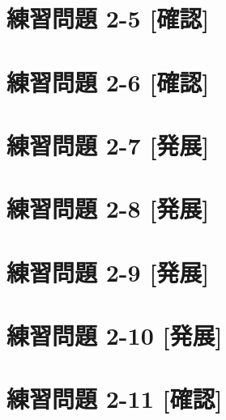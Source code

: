 \documentclass[
]{book}
\begin{document}
\hypertarget{ux7df4ux7fd2ux554fux984c-2-5-ux78baux8a8d}{%
\section*{練習問題 2-5 {[}確認{]}}\label{ux7df4ux7fd2ux554fux984c-2-5-ux78baux8a8d}}

\hypertarget{ux7df4ux7fd2ux554fux984c-2-6-ux78baux8a8d}{%
\section*{練習問題 2-6 {[}確認{]}}\label{ux7df4ux7fd2ux554fux984c-2-6-ux78baux8a8d}}

\hypertarget{ux7df4ux7fd2ux554fux984c-2-7-ux767aux5c55}{%
\section*{練習問題 2-7 {[}発展{]}}\label{ux7df4ux7fd2ux554fux984c-2-7-ux767aux5c55}}

\hypertarget{ux7df4ux7fd2ux554fux984c-2-8-ux767aux5c55}{%
\section*{練習問題 2-8 {[}発展{]}}\label{ux7df4ux7fd2ux554fux984c-2-8-ux767aux5c55}}

\hypertarget{ux7df4ux7fd2ux554fux984c-2-9-ux767aux5c55}{%
\section*{練習問題 2-9 {[}発展{]}}\label{ux7df4ux7fd2ux554fux984c-2-9-ux767aux5c55}}

\hypertarget{ux7df4ux7fd2ux554fux984c-2-10-ux767aux5c55}{%
\section*{練習問題 2-10 {[}発展{]}}\label{ux7df4ux7fd2ux554fux984c-2-10-ux767aux5c55}}

\hypertarget{ux7df4ux7fd2ux554fux984c-2-11-ux78baux8a8d}{%
\section*{練習問題 2-11 {[}確認{]}}\label{ux7df4ux7fd2ux554fux984c-2-11-ux78baux8a8d}}
\end{document}

